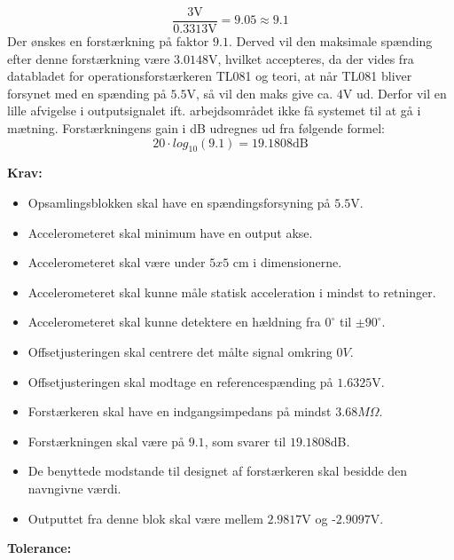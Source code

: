 \begin{equation}
\dfrac{3\text{V}}{0.3313\text{V}} =  9.05 \approx 9.1
\end{equation}
\noindent Der ønskes en forstærkning på faktor $9.1$. Derved vil den maksimale spænding efter denne forstærkning være $3.0148$V, hvilket accepteres, da der vides fra databladet for operationsforstærkeren TL081 og teori, at når TL081 bliver forsynet med en spænding på $5.5$V, så vil den maks give ca. $4$V ud. \cite{Corporation1995} Derfor vil en lille afvigelse i outputsignalet ift. arbejdsområdet ikke få systemet til at gå i mætning. Forstærkningens gain i dB udregnes ud fra følgende formel: 
\begin{equation}
20 \cdot log_{10} (9.1) = 19.1808\text{dB}
\end{equation} 

\noindent\textbf{Krav:}
\begin{itemize}
	\item Opsamlingsblokken skal have en spændingsforsyning på $5.5$V.
	\item Accelerometeret skal minimum have en output akse.%
	\item Accelerometeret skal være under $5x5$ cm i dimensionerne.%
	\item Accelerometeret skal kunne måle statisk acceleration i mindst to retninger.
	\item Accelerometeret skal kunne detektere en hældning fra $0^{\circ}$ til $\pm90^{\circ}$.
	\item Offsetjusteringen skal centrere det målte signal omkring $0V$.
	\item Offsetjusteringen skal modtage en referencespænding på $1.6325$V.
	\item Forstærkeren skal have en indgangsimpedans på mindst $3.68M\Omega$.
	\item Forstærkningen skal være på $9.1$, som svarer til $19.1808$dB.
	\item De benyttede modstande til designet af forstærkeren skal besidde den navngivne værdi.
	\item Outputtet fra denne blok skal være mellem $2.9817$V og -$2.9097$V.
\end{itemize}
\textbf{Tolerance:}
